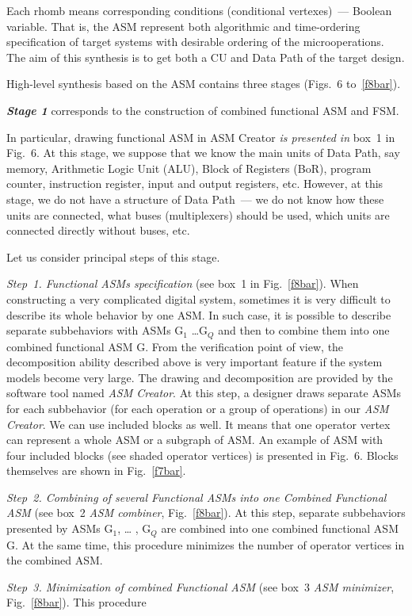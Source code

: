 \begin{multicols}{2}

\noindent
Each rhomb means corresponding conditions (con\-dition\-al
vertexes)~--- Boolean variable. That is, the ASM represent both algorithmic and time-ordering specification of
target systems with desirable ordering of the microoperations. The aim of this synthesis is to get both a
CU and Data Path of the target design.


   High-level synthesis based on the ASM contains three stages (Figs.~6 to~\ref{f8bar}).
   
{\bfseries\textit{Stage 1}} corresponds to the construction of combined functional ASM and FSM.
  
   In particular, drawing functional ASM in ASM Creator \textit{is presented in} box~1 in Fig.~6. At
this stage, we suppose that we know the main units of Data Path, say memory, Arithmetic Logic Unit (ALU),
Block of Registers (BoR), program counter, instruction register, input and output registers, etc. However, at this
stage, we do not have a structure of Data Path~--- we do not know how these units are connected, what buses
(multi\-plexers) should be used, which units are connected directly without buses, etc.

Let us consider principal steps of this stage.

\textit{Step~1. Functional ASMs specification} (see box~1 in Fig.~\ref{f8bar}). When constructing a very
complicated digital system, sometimes it is very difficult to describe its whole behavior by one ASM. In such
case, it is possible to describe separate subbehaviors with ASMs G$_1$ \ldots G$_Q$ and then to combine them
into one combined functional ASM G. From the verification point of view, the decomposition ability described
above is very important feature if the system models become very large. The drawing and decomposition are
provided by the software tool named \textit{ASM Creator}.  At this step, a designer draws separate ASMs for
each subbehavior (for each operation or a group of operations) in our \textit{ASM Creator}. We can use
included blocks as well. It means that one operator vertex can represent a whole ASM or a subgraph of ASM.
An example of ASM with four included blocks (see shaded operator vertices) is presented in Fig.~6.
Blocks themselves are shown in Fig.~\ref{f7bar}.

\textit{Step~2. Combining of several Functional ASMs into one Combined Functional ASM} (see box~2
\textit{ASM combiner}, Fig.~\ref{f8bar}). At this step, separate subbehaviors presented by ASMs G$_1$, \ldots
, G$_Q$ are combined into one combined functional ASM G. At the same time, this procedure minimizes the
number of operator vertices in the combined ASM.

\textit{Step~3. Minimization of combined Functional ASM} (see box~3 \textit{ASM minimizer},
Fig.~\ref{f8bar}). This procedure\linebreak %
\end{multicols}

